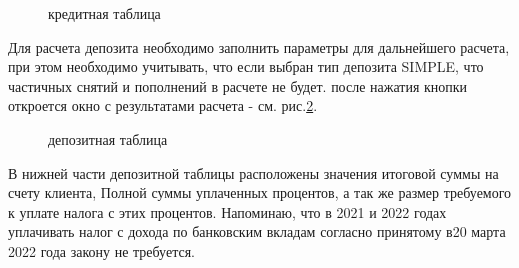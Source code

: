 \documentclass[10pt, letterpaper, final]{article}
\begin{document}
\begin{figure}[H]
   \caption{кредитная таблица}
   \label{fig:mesh3}
\end{figure}
\newpage
Для расчета депозита необходимо заполнить параметры для дальнейшего расчета, при этом необходимо учитывать, что если выбран тип депозита SIMPLE, что частичных снятий и пополнений в расчете не будет.
после нажатия кнопки откроется окно с результатами расчета - см. рис.\ref{fig:mesh4}.

\begin{figure}[H]
   \caption{депозитная таблица}
   \label{fig:mesh4}
\end{figure}
В нижней части депозитной таблицы расположены значения итоговой суммы на счету клиента, Полной суммы уплаченных процентов, а так же размер требуемого к уплате налога с этих процентов. Напоминаю, что в 2021 и 2022 годах уплачивать налог с дохода по банковским вкладам согласно принятому в20 марта 2022 года закону не требуется. 
\end{document}
